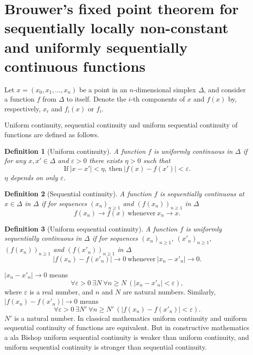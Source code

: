 \documentclass[reqno]{amsart}
\newtheorem{defn}{Definition}
\begin{document}
\section{Brouwer's fixed point theorem for sequentially locally non-constant and uniformly sequentially continuous functions}

Let $x=(x_0, x_1, \dots, x_n)$ be a point in an $n$-dimensional simplex $\Delta$, and consider a function $f$ from $\Delta$ to itself.  Denote the $i$-th components of $x$ and $f(x)$ by, respectively, $x_i$ and $f_i(x)$ or $f_i$. 

Uniform continuity, sequential continuity and uniform sequential continuity of functions are defined as follows.
\begin{defn}[Uniform continuity]
A function $f$ is uniformly continuous in $\Delta$ if for any $x, x'\in \Delta$ and $\varepsilon>0$ there exists $\eta>0$ such that
\[\mathrm{If}\ |x-x'|<\eta,\mathrm{\ then}\ |f(x)-f(x')|<\varepsilon.\]
$\eta$ depends on only $\varepsilon$.
\end{defn}
\begin{defn}[Sequential continuity]
A function $f$ is sequentially continuous at $x\in \Delta$ in $\Delta$ if for sequences $(x_n)_{n\geq 1}$ and $(f(x_n))_{n\geq 1}$ in $\Delta$
\[f(x_n)\longrightarrow f(x)\ \mathrm{whenever}\ x_n\longrightarrow x.\]
\end{defn}
\begin{defn}[Uniform sequential continuity]
A function $f$ is uniformly sequentially continuous in $\Delta$ if for sequences $(x_n)_{n\geq 1}$, $(x'_n)_{n\geq 1}$, $(f(x_n))_{n\geq 1}$ and $(f(x'_n))_{n\geq 1}$ in $\Delta$
\[|f(x_n)-f(x'_n)|\longrightarrow 0\ \mathrm{whenever}\ |x_n-x'_n|\longrightarrow 0.\]
\end{defn}
$|x_n-x'_n|\longrightarrow 0$ means
\[\forall \varepsilon>0\ \exists N\ \forall n\geq N\ (|x_n-x'_n|<\varepsilon),\]
where $\varepsilon$ is a real number, and $n$ and $N$ are natural numbers. Similarly, $|f(x_n)-f(x'_n)|\longrightarrow 0$ means
\[\forall \varepsilon>0\ \exists N'\ \forall n\geq N'\ (|f(x_n)-f(x'_n)|<\varepsilon).\]
$N'$ is a natural number. In classical mathematics uniform continuity and uniform sequential continuity of functions are equivalent. But in constructive mathematics a ala Bishop uniform sequential continuity is weaker than uniform continuity, and uniform sequential continuity is stronger than sequential continuity. 
\end{document}
